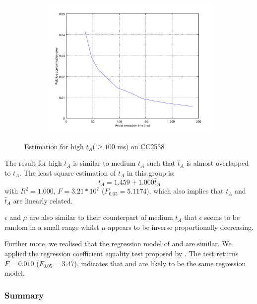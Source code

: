 \begin{figure}[ht!]
\begin{subfigure}{0.45\linewidth}
	\end{subfigure}
	\begin{subfigure}{0.45\linewidth}
	\center
	\includegraphics[width=\linewidth]{fig/highrtvtaerr.png}
	\end{subfigure}
	\caption{Estimation for high $t_A$($\geq 100$ ms) on CC2538}
	\label{Fig: Estimation for high tA}
\end{figure}

The result for high $t_A$ is similar to medium $t_A$ such that $\hat{t}_A$ is almost overlapped to $t_A$. The least square estimation of $t_A$ in this group is:
\begin{equation} \label{Eq: hita}
	t_A = 1.459 + 1.000\hat{t}_A
\end{equation}
with $R^2 = 1.000$, $F=3.21 * 10^{7}$ ($F_{0.05} = 5.1174$), which also implies that $t_A$ and $\hat{t}_A$ are linearly related.

$\epsilon$ and $\mu$ are also similar to their counterpart of medium $t_A$ that $\epsilon$ seems to be random in a small range whilst $\mu$ appears to be inverse proportionally decreasing.

Further more, we realised that the regression model of  and  are similar. We applied the regression coefficient equality test proposed by \cite{CoeEqTest}. The test returns $F=0.010$ ($F_{0.05} = 3.47$), indicates that  and  are likely to be the same regression model.

\subsubsection{Summary}

